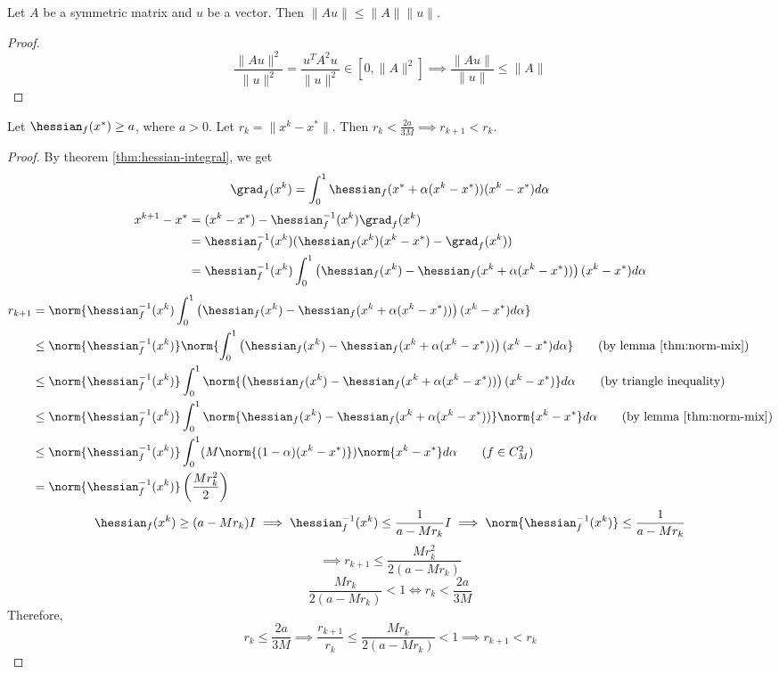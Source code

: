 \begin{lemma} \label{thm:norm-mix}
Let $A$ be a symmetric matrix and $u$ be a vector. Then $\|Au\| \le \|A\|\|u\|$.
\end{lemma}
\begin{proof}
\[ \frac{\|Au\|^2}{\|u\|^2} = \frac{u^TA^2u}{\|u\|^2} \in [0, \|A\|^2]
\implies \frac{\|Au\|}{\|u\|} \le \|A\| \]
\end{proof}

\begin{theorem}
Let $\hessian_f(x^*) \ge a$, where $a > 0$.
Let $r_k = \|x^k - x^*\|$.
Then $r_k < \frac{2a}{3M} \implies r_{k+1} < r_k$.
\end{theorem}
\begin{proof}
By theorem \ref{thm:hessian-integral}, we get
\[ \grad_f(x^k) = \int_0^1 \hessian_f(x^* + \alpha(x^k - x^*))(x^k - x^*)d\alpha \]
\begin{align*}
x^{k+1} - x^* &= (x^k - x^*) - \hessian_f^{-1}(x^k) \grad_f(x^k)
\\ &= \hessian_f^{-1}(x^k)(\hessian_f(x^k)(x^k - x^*) - \grad_f(x^k))
\\ &= \hessian_f^{-1}(x^k)\int_0^1 \left(\hessian_f(x^k)
- \hessian_f(x^k + \alpha(x^k - x^*))\right)(x^k - x^*)d\alpha
\end{align*}
\begin{align*}
r_{k+1} &= \norm{\hessian_f^{-1}(x^k)\int_0^1 \left(\hessian_f(x^k)
- \hessian_f(x^k + \alpha(x^k - x^*))\right)(x^k - x^*)d\alpha}
\\ &\le \norm{\hessian_f^{-1}(x^k)}\norm{\int_0^1 \left(\hessian_f(x^k)
- \hessian_f(x^k + \alpha(x^k - x^*))\right)(x^k - x^*)d\alpha} \tag{by lemma \ref{thm:norm-mix}}
\\ &\le \norm{\hessian_f^{-1}(x^k)}\int_0^1 \norm{\left(\hessian_f(x^k)
- \hessian_f(x^k + \alpha(x^k - x^*))\right)(x^k - x^*)}d\alpha \tag{by triangle inequality}
\\ &\le \norm{\hessian_f^{-1}(x^k)}\int_0^1 \norm{\hessian_f(x^k)
- \hessian_f(x^k + \alpha(x^k - x^*))}\norm{x^k - x^*}d\alpha \tag{by lemma \ref{thm:norm-mix}}
\\ &\le \norm{\hessian_f^{-1}(x^k)}\int_0^1 (M\norm{(1-\alpha)(x^k - x^*)})\norm{x^k - x^*}d\alpha
\tag{$f \in C^2_M$}
\\ &= \norm{\hessian_f^{-1}(x^k)}\left(\frac{Mr_k^2}{2}\right)
\end{align*}
\[ \hessian_f(x^k) \ge (a-Mr_k)I
\implies \hessian_f^{-1}(x^k) \le \frac{1}{a-Mr_k}I
\implies \norm{\hessian_f^{-1}(x^k)} \le \frac{1}{a-Mr_k} \]
\[ \implies r_{k+1} \le \frac{Mr_k^2}{2(a-Mr_k)} \]
\[ \frac{Mr_k}{2(a-Mr_k)} < 1 \iff r_k < \frac{2a}{3M} \]
Therefore,
\[ r_k \le \frac{2a}{3M} \implies \frac{r_{k+1}}{r_k} \le \frac{Mr_k}{2(a-Mr_k)} < 1 \implies r_{k+1} < r_k \]
\end{proof}

